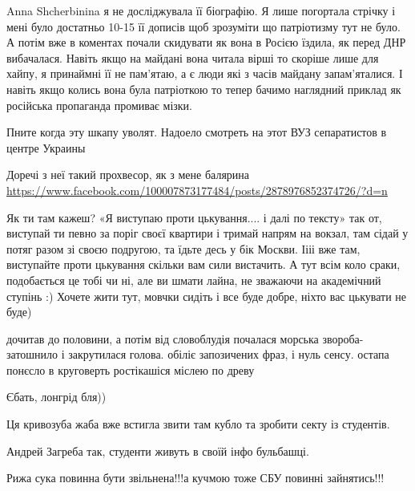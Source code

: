\begin{itemize}
\begin{itemize}
Anna Shcherbinina я не досліджувала її біографію. Я лише погортала стрічку і
мені було достатньо 10-15 її дописів щоб зрозуміти що патріотизму тут не було.
А потім вже в коментах почали скидувати як вона в Росією їздила, як перед ДНР
вибачалася.  Навіть якщо на майдані вона читала вірші то скоріше лише для
хайпу, я принаймні її не пам’ятаю, а є люди які з часів майдану запам’яталися.
І навіть якщо колись вона була патріоткою то тепер бачимо наглядний приклад як
російська пропаганда промиває мізки.

\end{itemize}


Пните когда эту шкапу уволят. Надоело смотреть на этот ВУЗ сепаратистов в центре Украины


Доречі з неї такий прохвесор, як з мене балярина
\url{https://www.facebook.com/100007873177484/posts/2878976852374726/?d=n}


Як ти там кажеш? «Я виступаю проти цькування.... і далі по тексту» так от,
виступай ти певно за поріг своєї квартири і тримай напрям на вокзал, там сідай
у потяг разом зі своєю подругою, та їдьте десь у бік Москви. Іііі вже там,
виступайте проти цькування скільки вам сили вистачить. А тут всім коло сраки,
подобається це тобі чи ні, але ви шмати лайна, не зважаючи на академічний
ступінь :) Хочете жити тут, мовчки сидіть і все буде добре, ніхто вас цькувати
не буде)


дочитав до половини, а потім від словоблудія почалася морська звороба-
затошнило і закрутилася голова. обіліє запозичених фраз, і нуль сенсу. остапа
понєсло в круговерть ростікашіся міслею по древу


Єбать, лонгрід бля))


Ця кривозуба жаба вже встигла звити там кубло та зробити секту із студентів.

Андрей Загреба так, студенти живуть в своїй інфо бульбашці.


Рижа сука повинна бути звільнена!!!а кучмою тоже СБУ повинні зайнятись!!!


\end{itemize}
